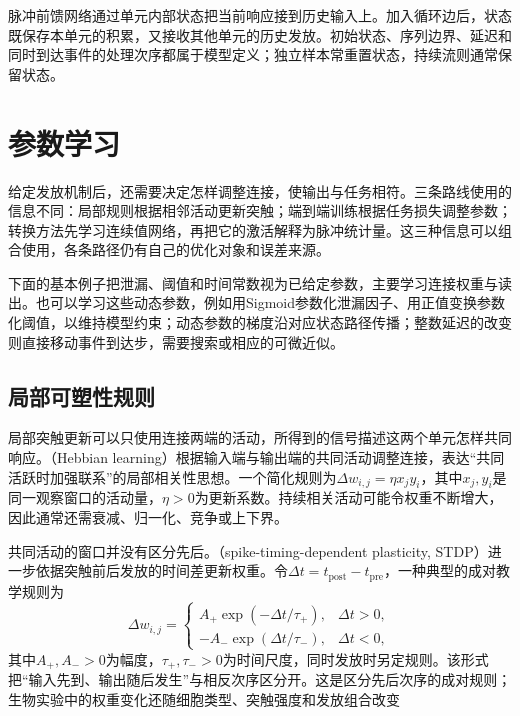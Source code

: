 脉冲前馈网络通过单元内部状态把当前响应接到历史输入上。加入循环边后，状态既保存本单元的积累，又接收其他单元的历史发放。初始状态、序列边界、延迟和同时到达事件的处理次序都属于模型定义；独立样本常重置状态，持续流则通常保留状态。

\section{参数学习}
\label{sec:snn-learning}

给定发放机制后，还需要决定怎样调整连接，使输出与任务相符。三条路线使用的信息不同：局部规则根据相邻活动更新突触；端到端训练根据任务损失调整参数；转换方法先学习连续值网络，再把它的激活解释为脉冲统计量。这三种信息可以组合使用，各条路径仍有自己的优化对象和误差来源。

下面的基本例子把泄漏、阈值和时间常数视为已给定参数，主要学习连接权重与读出。也可以学习这些动态参数，例如用Sigmoid参数化泄漏因子、用正值变换参数化阈值，以维持模型约束；动态参数的梯度沿对应状态路径传播；整数延迟的改变则直接移动事件到达步，需要搜索或相应的可微近似。

\subsection{局部可塑性规则}
\label{sec:snn-plasticity}

局部突触更新可以只使用连接两端的活动，所得到的信号描述这两个单元怎样共同响应。（Hebbian learning）根据输入端与输出端的共同活动调整连接，表达“共同活跃时加强联系”的局部相关性思想。一个简化规则为$\Delta w_{i,j}=\eta x_jy_i$，其中$x_j,y_i$是同一观察窗口的活动量，$\eta>0$为更新系数。持续相关活动可能令权重不断增大，因此通常还需衰减、归一化、竞争或上下界。

共同活动的窗口并没有区分先后。（spike-timing-dependent plasticity, STDP）进一步依据突触前后发放的时间差更新权重。令$\Delta t=t_{\mathrm{post}}-t_{\mathrm{pre}}$，一种典型的成对教学规则为
\begin{equation}
  \Delta w_{i,j}=\begin{cases}
    A_+\exp(-\Delta t/\tau_+),&\Delta t>0,\\
    -A_-\exp(\Delta t/\tau_-),&\Delta t<0,
  \end{cases}
  \label{eq:snn-stdp}
\end{equation}
其中$A_+,A_->0$为幅度，$\tau_+,\tau_->0$为时间尺度，同时发放时另定规则。该形式把“输入先到、输出随后发生”与相反次序区分开。这是区分先后次序的成对规则；生物实验中的权重变化还随细胞类型、突触强度和发放组合改变

